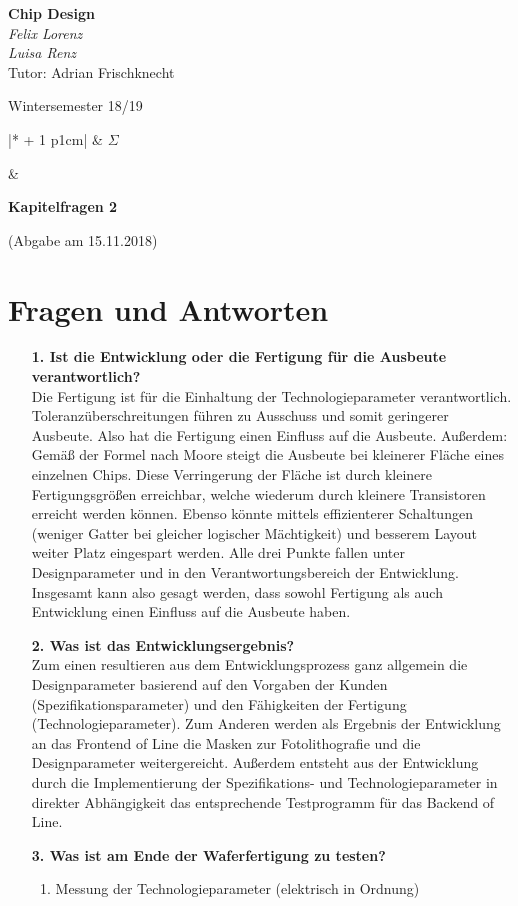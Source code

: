 \documentclass[a4paper,10pt,headsepline, DIV11]{scrartcl}%
\newcounter{aufgabe}
\def\tand{&}
\newcommand{\makeTableLine}[2][0]{%
	\setcounter{aufgabe}{1}%
	\whiledo{\value{aufgabe} < #1}%
	{%
		#2\tand\stepcounter{aufgabe}%
	}
}
\newcommand{\aufgTable}[1]{
	\def\spalten{\numexpr #1 + 1 \relax}
	\begin{tabular}{|*{\spalten}{p{1cm}|}}
		\makeTableLine[\spalten]{\theaufgabe}$\Sigma$~~\\ \hline
		\rule{0pt}{15pt}\makeTableLine[\spalten]{}\\
	\end{tabular}
}
\def\header#1#2#3#4#5#6#7#8{\pagestyle{empty}
	\begin{minipage}[t]{0.47\textwidth}
		\begin{flushleft}
			{\textbf{#4}}\\
			#5\\
			Tutor: #2\\
			#8
		\end{flushleft}
	\end{minipage}
	\begin{minipage}[t]{0.5\textwidth}
		\begin{flushright}
			#6 \vspace{0.5cm}\\
			\aufgTable{#7}
		\end{flushright}
	\end{minipage}
	\vspace{1cm}
	\begin{center}
		{\Large \textbf{Kapitelfragen #1}}
		
		{(Abgabe am #3)}
	\end{center}
}
\begin{document}
	\header{2}{Adrian Frischknecht}{15.11.2018}{Chip Design}{\textit{Felix Lorenz}\\ \textit{Luisa Renz}}{Wintersemester 18/19}{0}{}
	\vspace{1cm}
	\section*{Fragen und Antworten}
	\begin{itemize}
		\item[\textbf{1. Ist die Entwicklung oder die Fertigung für die Ausbeute  verantwortlich?}]\hfill \\
		Die Fertigung ist für die Einhaltung der Technologieparameter verantwortlich. Toleranzüberschreitungen führen zu Ausschuss und somit geringerer Ausbeute. Also hat die Fertigung einen Einfluss auf die Ausbeute.
		Außerdem: Gemäß der Formel nach Moore steigt die Ausbeute bei kleinerer Fläche eines einzelnen Chips. Diese Verringerung der Fläche ist durch kleinere Fertigungsgrößen erreichbar, welche wiederum durch kleinere Transistoren erreicht werden können. Ebenso könnte mittels effizienterer Schaltungen (weniger Gatter bei gleicher logischer Mächtigkeit) und besserem Layout weiter Platz eingespart werden. Alle drei Punkte fallen unter Designparameter und in den Verantwortungsbereich der Entwicklung.\\
		Insgesamt kann also gesagt werden, dass sowohl Fertigung als auch Entwicklung einen Einfluss auf die Ausbeute haben.
		\item[\textbf{2. Was ist das Entwicklungsergebnis?}]\hfill \\
		Zum einen resultieren aus dem Entwicklungsprozess ganz allgemein die Designparameter basierend auf den Vorgaben der Kunden (Spezifikationsparameter) und den Fähigkeiten der Fertigung (Technologieparameter). Zum Anderen werden als Ergebnis der Entwicklung an das Frontend of Line die Masken zur Fotolithografie und die Designparameter weitergereicht. Außerdem entsteht aus der Entwicklung durch die Implementierung der Spezifikations- und Technologieparameter in direkter Abhängigkeit das entsprechende Testprogramm für das Backend of Line.
		\item[\textbf{3. Was ist am Ende der Waferfertigung zu testen?}]\hfill
		\begin{enumerate}
			\item Messung der Technologieparameter (elektrisch in Ordnung)

\end{enumerate}
\end{itemize}
\end{document}
